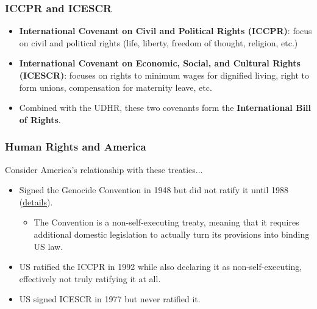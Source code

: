\documentclass{beamer}
\begin{document}
\begin{frame} 
	\frametitle{\LARGE{ICCPR and ICESCR}}
	\begin{itemize}
		\item \textbf{International Covenant on Civil and Political Rights (ICCPR)}: focus on civil and political rights (life, liberty, freedom of thought, religion, etc.) \pause
		\item \textbf{International Covenant on Economic, Social, and Cultural Rights (ICESCR)}: focuses on rights to minimum wages for dignified living, right to form unions, compensation for maternity leave, etc.	
		\item Combined with the UDHR, these two covenants form the \textbf{International Bill of Rights}.
	\end{itemize}
\end{frame}

\begin{frame} 
	\frametitle{\LARGE{Human Rights and America}}
	Consider America's relationship with these treaties...
	\begin{itemize}
		\item Signed the Genocide Convention in 1948 but did not ratify it until 1988 (\href{https://enoughproject.org/blog/day-us-ratifies-genocide-convention}{details}).
		\begin{itemize}
			\item The Convention is a non-self-executing treaty, meaning that it requires additional domestic legislation to actually turn its provisions into binding US law. \pause
		\end{itemize}
		\item US ratified the ICCPR in 1992 while also declaring it as non-self-executing, effectively not truly ratifying it at all.\pause
		\item US signed ICESCR in 1977 but never ratified it. 
	\end{itemize}
	
\end{frame}
\end{document}
